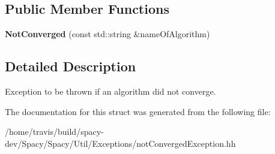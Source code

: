 \subsection*{\-Public \-Member \-Functions}
\begin{DoxyCompactItemize}
\item 
\hypertarget{structSpacy_1_1Exception_1_1NotConverged_ad8da434f7ab60570e598b4e3a659072d}{{\bfseries \-Not\-Converged} (const std\-::string \&name\-Of\-Algorithm)}\label{structSpacy_1_1Exception_1_1NotConverged_ad8da434f7ab60570e598b4e3a659072d}

\end{DoxyCompactItemize}


\subsection{\-Detailed \-Description}
\-Exception to be thrown if an algorithm did not converge. 

\-The documentation for this struct was generated from the following file\-:\begin{DoxyCompactItemize}
\item 
/home/travis/build/spacy-\/dev/\-Spacy/\-Spacy/\-Util/\-Exceptions/not\-Converged\-Exception.\-hh\end{DoxyCompactItemize}
